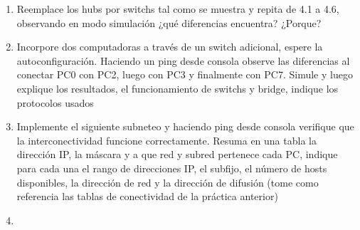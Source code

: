 \documentclass[11pt]{article}
\begin{document}
\begin{enumerate}
\begin{enumerate}
    \end{enumerate}
    \item Reemplace los hubs por switchs tal como se muestra y repita de 4.1 a 4.6, observando en modo simulación ¿qué diferencias encuentra? ¿Porque?
    \item Incorpore dos computadoras a través de un switch adicional, espere la autoconfiguración. Haciendo un ping desde consola observe las diferencias al conectar PC0 con PC2, luego con PC3 y finalmente con PC7. Simule y luego explique los resultados, el funcionamiento de switchs y bridge, indique los protocolos usados
    \item Implemente el siguiente subneteo y haciendo ping desde consola verifique que la interconectividad funcione correctamente. Resuma en una tabla la dirección IP, la máscara y a que red y subred pertenece cada PC, indique para cada una el rango de direcciones IP, el subfijo, el número de hosts disponibles, la dirección de red y la dirección de difusión (tome como referencia las tablas de conectividad de la práctica anterior)
    \item 
\end{enumerate}

\newpage




\end{document}

